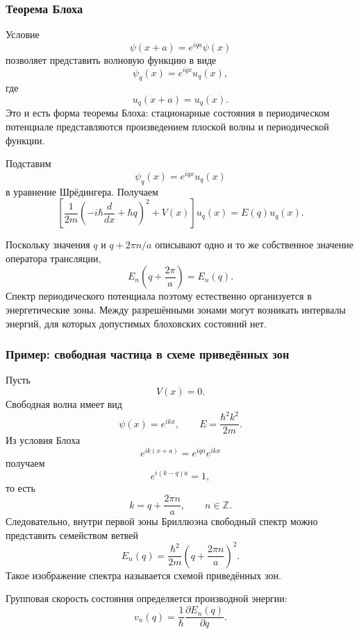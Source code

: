 \documentclass[12pt,a4paper]{article}
\begin{document}
\subsubsection{Теорема Блоха}

Условие
\[
    \psi(x+a)
    =
    e^{iqa}\psi(x)
\]
позволяет представить волновую функцию в виде
\[
    \boxed{
        \psi_q(x)
        =
        e^{iqx}u_q(x)
    },
\]
где
\[
    \boxed{
        u_q(x+a)=u_q(x)
    }.
\]
Это и есть форма теоремы Блоха: стационарные состояния в периодическом
потенциале представляются произведением плоской волны и периодической
функции.

Подставим
\[
    \psi_q(x)=e^{iqx}u_q(x)
\]
в уравнение Шрёдингера. Получаем
\[
    \boxed{
    \left[
        \frac{1}{2m}
        \left(
            -i\hbar\frac{d}{dx}
            +
            \hbar q
        \right)^2
        +
        V(x)
    \right]
    u_q(x)
    =
    E(q)u_q(x)
    }.
\]

Поскольку значения $q$ и $q+2\pi n/a$ описывают одно и то же
собственное значение оператора трансляции,
\[
    \boxed{
        E_n\left(q+\frac{2\pi}{a}\right)
        =
        E_n(q)
    }.
\]
Спектр периодического потенциала поэтому естественно организуется в
энергетические зоны. Между разрешёнными зонами могут возникать
интервалы энергий, для которых допустимых блоховских состояний нет.


\subsubsection{Пример: свободная частица в схеме приведённых зон}

Пусть
\[
    V(x)=0.
\]
Свободная волна имеет вид
\[
    \psi(x)=e^{ikx},
    \qquad
    E=\frac{\hbar^2k^2}{2m}.
\]
Из условия Блоха
\[
    e^{ik(x+a)}
    =
    e^{iqa}e^{ikx}
\]
получаем
\[
    e^{i(k-q)a}=1,
\]
то есть
\[
    \boxed{
        k=q+\frac{2\pi n}{a},
        \qquad
        n\in\mathbb Z
    }.
\]
Следовательно, внутри первой зоны Бриллюэна свободный спектр можно
представить семейством ветвей
\[
    \boxed{
        E_n(q)
        =
        \frac{\hbar^2}{2m}
        \left(
            q+\frac{2\pi n}{a}
        \right)^2
    }.
\]
Такое изображение спектра называется схемой приведённых зон.

Групповая скорость состояния определяется производной энергии:
\[
    \boxed{
        v_n(q)
        =
        \frac{1}{\hbar}
        \frac{\partial E_n(q)}{\partial q}
    }.
\]
\end{document}
